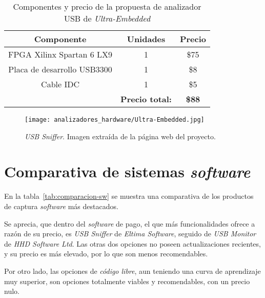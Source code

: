\begin{itemize}
    \begin{table}[hbtp]
        \centering
        \caption{Componentes y precio de la propuesta de analizador USB de \emph{Ultra-Embedded}}
        \label{tab:precio-ultra-embedded}
        \begin{tabular}{|c|c|c|}
            \hline
            \textbf{Componente} &
            \textbf{Unidades} &
            \textbf{Precio} \\ \hline
            \hline

            FPGA Xilinx Spartan 6 LX9 &
            1 & \$75 \\ \hline

            Placa de desarrollo USB3300 &
            1 &
            \$8 \\ \hline

            Cable IDC &
            1 &
            \$5 \\ \hline
            
            \multicolumn{1}{r}{} &
            \multicolumn{1}{c}{\textbf{Precio total:}} &
            \multicolumn{1}{c}{\textbf{\$88}} \\
        \end{tabular}
    \end{table}

    \begin{figure}[hbtp]
        \centering
        \texttt{[image: analizadores\_hardware/Ultra-Embedded.jpg]}
        \caption{\emph{USB Sniffer}. Imagen extraída de la página web del proyecto.}
        \label{fig:ultra-embedded}
    \end{figure}
\end{itemize}


\newpage
\section{Comparativa de sistemas \emph{software}}
En la tabla~\ref{tab:comparacion-sw} se muestra una comparativa de los productos de captura \emph{software} más destacados.

Se aprecia, que dentro del \emph{software} de pago, el que más funcionalidades ofrece a razón de su precio, es \emph{USB Sniffer} de \emph{Eltima Software}, seguido de \emph{USB Monitor} de \emph{HHD Software Ltd}. Las otras dos opciones no poseen actualizaciones recientes, y su precio es más elevado, por lo que son menos recomendables.

Por otro lado, las opciones de \emph{código libre}, aun teniendo una curva de aprendizaje muy superior, son opciones totalmente viables y recomendables, con un precio nulo.

